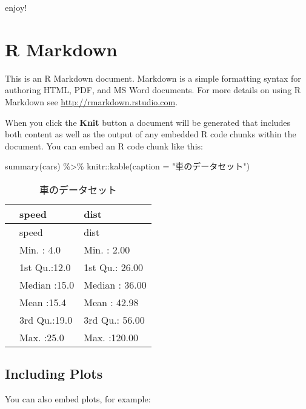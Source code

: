 \documentclass[
  12pt,
  a4paper,xelatex,ja=standard]{bxjsarticle}
\newenvironment{Shaded}{\begin{snugshade}}{\end{snugshade}}
\newcommand{\AttributeTok}[1]{\textcolor[rgb]{0.77,0.63,0.00}{#1}}
\newcommand{\FunctionTok}[1]{\textcolor[rgb]{0.00,0.00,0.00}{#1}}
\newcommand{\NormalTok}[1]{#1}
\newcommand{\SpecialCharTok}[1]{\textcolor[rgb]{0.00,0.00,0.00}{#1}}
\newcommand{\StringTok}[1]{\textcolor[rgb]{0.31,0.60,0.02}{#1}}
\begin{document}
enjoy!

\newpage

\hypertarget{r-markdown}{%
\section{R Markdown}\label{r-markdown}}

This is an R Markdown document. Markdown is a simple formatting syntax
for authoring HTML, PDF, and MS Word documents. For more details on
using R Markdown see \url{http://rmarkdown.rstudio.com}.

When you click the \textbf{Knit} button a document will be generated
that includes both content as well as the output of any embedded R code
chunks within the document. You can embed an R code chunk like this:

\begin{Shaded}
\begin{Highlighting}[numbers=left,,]
\FunctionTok{summary}\NormalTok{(cars) }\SpecialCharTok{\%\textgreater{}\%}
\NormalTok{  knitr}\SpecialCharTok{::}\FunctionTok{kable}\NormalTok{(}\AttributeTok{caption =} \StringTok{"車のデータセット"}\NormalTok{)}
\end{Highlighting}
\end{Shaded}

\begin{longtable}[]{@{}lll@{}}
\caption{車のデータセット}\tabularnewline
\toprule
& speed & dist \\
\midrule
\endfirsthead
\toprule
& speed & dist \\
\midrule
\endhead
& Min. : 4.0 & Min. : 2.00 \\
& 1st Qu.:12.0 & 1st Qu.: 26.00 \\
& Median :15.0 & Median : 36.00 \\
& Mean :15.4 & Mean : 42.98 \\
& 3rd Qu.:19.0 & 3rd Qu.: 56.00 \\
& Max. :25.0 & Max. :120.00 \\
\bottomrule
\end{longtable}

\newpage

\hypertarget{including-plots}{%
\subsection{Including Plots}\label{including-plots}}

You can also embed plots, for example:
\end{document}
